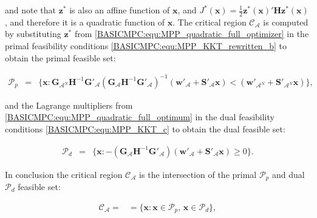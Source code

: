     and note that $\textbf{z}^*$ is also an affine function of $\textbf{x}$, and $J^*(\textbf{x})=\frac{1}{2}\textbf{z}^*(\textbf{x})'\textbf{H}\textbf{z}^*(\textbf{x})$, and therefore it is a quadratic function of $\textbf{x}$. The critical region $\mathcal{C}_{\mathcal{A}}$ is computed by substituting $\textbf{z}^*$ from \ref{BASICMPC:equ:MPP_quadratic_full_optimizer} in the primal feasibility conditions \ref{BASICMPC:equ:MPP_KKT_rewritten_b} to obtain the primal feasible set:

    \begin{equation}
    \begin{array}{rcl}
            \mathcal{P}_p&=&\{
            \textbf{x}:\textbf{G}_{\mathcal{A}^N}\textbf{H}^{-1}\textbf{G}'_{\mathcal{A}}(\textbf{G}_{\mathcal{A}}\textbf{H}^{-1}\textbf{G}'_{\mathcal{A}})^{-1}(\textbf{w}'_{\mathcal{A}}+\textbf{S}'_{\mathcal{A}}\textbf{x})
            <(\textbf{w}'_{\mathcal{A}^N}+\textbf{S}'_{\mathcal{A}^N}\textbf{x})
            \},
        \end{array}
        \label{BASICMPC:equ:MPP_quadratic_primalset}
    \end{equation}

    and the Lagrange multipliers from \ref{BASICMPC:equ:MPP_quadratic_full_optimum} in the dual feasibility conditions \ref{BASICMPC:equ:MPP_KKT_c} to obtain the dual feasible set:

    \begin{equation}
    \begin{array}{rcl}
            \mathcal{P}_d&=&\{
            \textbf{x}:-(\textbf{G}_{\mathcal{A}}\textbf{H}^{-1}\textbf{G}'_{\mathcal{A}})(\textbf{w}'_{\mathcal{A}}+\textbf{S}'_{\mathcal{A}}\textbf{x})\geq 0
            \}.
        \end{array}
        \label{BASICMPC:equ:MPP_quadratic_dualset}
    \end{equation}

    In conclusion the critical region $\mathcal{C}_{\mathcal{A}}$ is the intersection of the primal $\mathcal{P}_p$ and dual $\mathcal{P}_d$ feasible set:

    \begin{equation}
    \begin{array}{rcl}
            \mathcal{C}_{\mathcal{A}}=&=\{\textbf{x}:\textbf{x}\in\mathcal{P}_p,\,\textbf{x}\in\mathcal{P}_d\},
        \end{array}
        \label{BASICMPC:equ:MPP_quadratic_criticalset}
    \end{equation}

